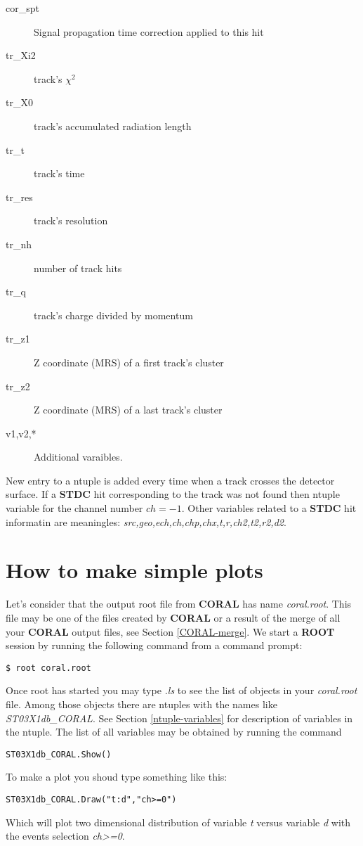 \documentclass[a4paper,12pt]{article}
\begin{document}
\begin{enumerate}
\begin{description}
\item[cor\_spt]  Signal propagation time correction applied to this hit
\item[tr\_Xi2] track's $\chi^2$
\item[tr\_X0]  track's accumulated radiation length
\item[tr\_t]   track's time
\item[tr\_res] track's resolution
\item[tr\_nh]  number of track hits
\item[tr\_q]   track's charge divided by momentum
\item[tr\_z1]  Z coordinate (MRS) of a first track's cluster
\item[tr\_z2]  Z coordinate (MRS) of a last track's cluster
\item[v1,v2,*] Additional varaibles.
\end{description}

New entry to a ntuple is added every time when a track crosses the detector surface.
If a {\bf STDC} hit corresponding to the track was not found then ntuple variable for
the channel number $ch=-1$. Other variables related to a {\bf STDC} hit informatin are
meaningles: {\it src,geo,ech,ch,chp,chx,t,r,ch2,t2,r2,d2}.


\section{How to make simple plots}
Let's consider that the output root file from {\bf CORAL} has name {\it coral.root}.
This file may be one of the files created by {\bf CORAL} or a result of the merge of all
your {\bf CORAL} output files, see Section \ref{CORAL-merge}. We start a {\bf ROOT} session
by running the following command from a command prompt:
\begin{verbatim}
$ root coral.root
\end{verbatim}
Once root has started you may type {\it .ls} to see the list of objects in your
{\it coral.root} file. Among those objects there are ntuples with the names like
{\it ST03X1db\_CORAL}. See Section \ref{ntuple-variables} for description of
variables in the ntuple. The list of all variables may be obtained by running the command
\begin{verbatim}
ST03X1db_CORAL.Show()
\end{verbatim}

To make a plot you shoud type something like this:
\begin{verbatim}
ST03X1db_CORAL.Draw("t:d","ch>=0")
\end{verbatim}
Which will plot two dimensional distribution of variable {\it t} versus variable {\it d}
with the events selection {\it ch>=0}.


\end{enumerate}
\end{document}
